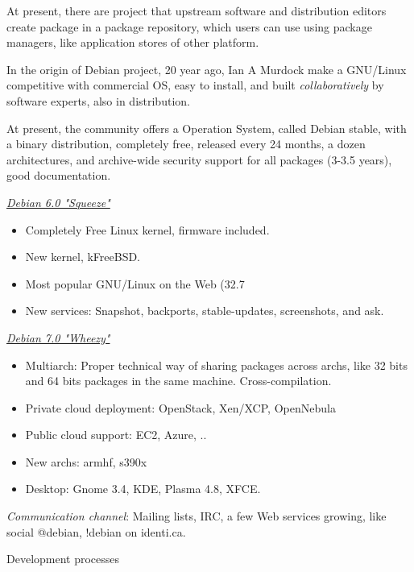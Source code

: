 \documentclass[11pt]{article}
\begin{document}
At present, there are project that upstream software and distribution editors create package in a package repository, which users can use using package managers, like application stores of other platform.

In the origin of Debian project, 20 year ago, Ian A Murdock make a GNU/Linux competitive with commercial OS, easy to install, and built \emph{collaboratively} by software experts, also in distribution.

At present, the community offers a Operation System, called Debian stable, with a binary distribution, completely free, released every 24 months, a dozen architectures, and archive-wide security support for all packages (3-3.5 years), good documentation.

\underline{\emph{Debian 6.0 "Squeeze"}}
\begin{itemize}
	\item Completely Free Linux kernel, firmware included.
	\item New kernel, kFreeBSD.
	\item Most popular GNU/Linux on the Web (32.7%
	\item New services: Snapshot, backports, stable-updates, screenshots, and ask.
\end{itemize}

\underline{\emph{Debian 7.0  "Wheezy"}}
\begin{itemize}
	\item Multiarch: 	Proper technical way of sharing packages across archs, like 32 bits and 64 bits packages in the same machine. Cross-compilation.
	\item Private cloud deployment:  OpenStack, Xen/XCP, OpenNebula
	\item Public cloud support: EC2, Azure, ..
	\item New archs: armhf, s390x
	\item Desktop: Gnome 3.4, KDE, Plasma 4.8, XFCE.
\end{itemize}

\emph{Communication channel}: Mailing lists, IRC, a few Web services growing, like social @debian, !debian on identi.ca.

Development processes
\end{document}
